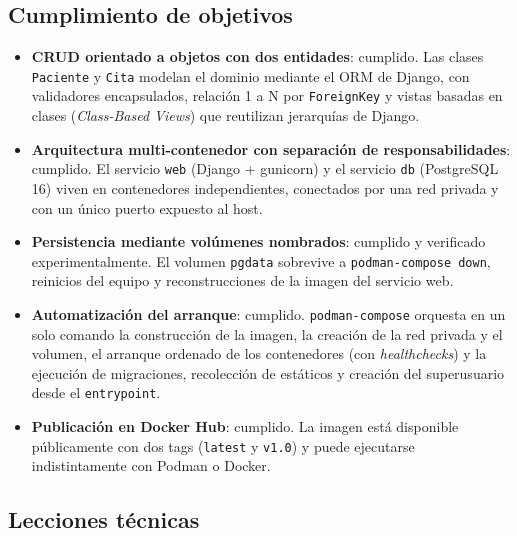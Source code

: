 \documentclass[12pt,a4paper]{article}
\begin{document}
\subsection{Cumplimiento de objetivos}

\begin{itemize}
    \item \textbf{CRUD orientado a objetos con dos entidades}: cumplido. Las clases \texttt{Paciente} y \texttt{Cita} modelan el dominio mediante el ORM de Django, con validadores encapsulados, relación 1 a N por \texttt{ForeignKey} y vistas basadas en clases (\textit{Class-Based Views}) que reutilizan jerarquías de Django.
    \item \textbf{Arquitectura multi-contenedor con separación de responsabilidades}: cumplido. El servicio \texttt{web} (Django + gunicorn) y el servicio \texttt{db} (PostgreSQL 16) viven en contenedores independientes, conectados por una red privada y con un único puerto expuesto al host.
    \item \textbf{Persistencia mediante volúmenes nombrados}: cumplido y verificado experimentalmente. El volumen \texttt{pgdata} sobrevive a \texttt{podman-compose down}, reinicios del equipo y reconstrucciones de la imagen del servicio web.
    \item \textbf{Automatización del arranque}: cumplido. \texttt{podman-compose} orquesta en un solo comando la construcción de la imagen, la creación de la red privada y el volumen, el arranque ordenado de los contenedores (con \textit{healthchecks}) y la ejecución de migraciones, recolección de estáticos y creación del superusuario desde el \texttt{entrypoint}.
    \item \textbf{Publicación en Docker Hub}: cumplido. La imagen está disponible públicamente con dos tags (\texttt{latest} y \texttt{v1.0}) y puede ejecutarse indistintamente con Podman o Docker.
\end{itemize}

\subsection{Lecciones técnicas}
\end{document}

